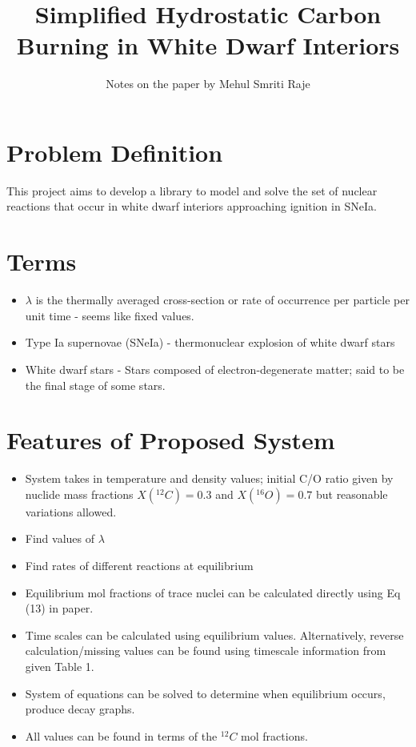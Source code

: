 \documentclass[11pt]{article}
\title{Simplified Hydrostatic Carbon Burning in White Dwarf Interiors}
\author{Notes on the paper by Mehul Smriti Raje}
\begin{document}
\maketitle{}

\section{Problem Definition}
This project aims to develop a library to model and solve the set of nuclear reactions that occur in white dwarf interiors approaching ignition in SNeIa.

\section{Terms}
	\begin{itemize}
		\item $\lambda$ is the thermally averaged cross-section or rate of occurrence per particle per unit time - seems like fixed values.
		\item Type Ia supernovae (SNeIa) - thermonuclear explosion of white dwarf stars
		\item White dwarf stars - Stars composed of electron-degenerate matter; said to be the final stage of some stars.
	\end{itemize}

\section{Features of Proposed System}
	\begin{itemize}
		\item System takes in temperature and density values; initial C/O ratio given by nuclide mass fractions $X(^{12}C) = 0.3$ and $X(^{16}O) = 0.7$ but reasonable variations allowed.
		\item Find values of $\lambda$ 
		\item Find rates of different reactions at equilibrium
		\item Equilibrium mol fractions of trace nuclei can be calculated directly using Eq (13) in paper.
		\item Time scales can be calculated using equilibrium values. Alternatively, reverse calculation/missing values can be found using timescale information from given Table 1.
		\item System of equations can be solved to determine when equilibrium occurs, produce decay graphs.
		\item All values can be found in terms of the $^{12}C$ mol fractions.
	\end{itemize}	
	
\end{document}
